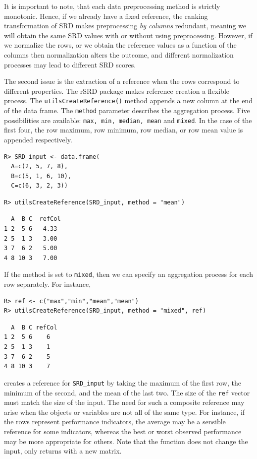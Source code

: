 It is important to note, that each data preprocessing method is strictly monotonic. Hence, if we already have a fixed reference, the ranking transformation of SRD makes preprocessing \emph{by columns} redundant, meaning we will obtain the same SRD values with or without using preprocessing. However, if we normalize the rows, or we obtain the reference values as a function of the columns then normalization alters the outcome, and different normalization processes may lead to different SRD scores.

The second issue is the extraction of a reference when the rows correspond to different properties. The rSRD package makes reference creation a flexible process. The \texttt{utilsCreateReference()} method appends a new column at the end of the data frame. The \texttt{method} parameter describes the aggregation process. Five possibilities are available: \texttt{max, min, median, mean} and \texttt{mixed}. In the case of the first four, the row maximum, row minimum, row median, or row mean value is appended respectively.

\begin{verbatim}
R> SRD_input <- data.frame(
  A=c(2, 5, 7, 8),
  B=c(5, 1, 6, 10),
  C=c(6, 3, 2, 3))
\end{verbatim}

\begin{verbatim}
R> utilsCreateReference(SRD_input, method = "mean")
\end{verbatim}
\begin{verbatim}
  A  B C  refCol
1 2  5 6   4.33
2 5  1 3   3.00
3 7  6 2   5.00
4 8 10 3   7.00
\end{verbatim}

If the method is set to \texttt{mixed}, then we can specify an aggregation process for each row separately. For instance,

\begin{verbatim}
R> ref <- c("max","min","mean","mean")
R> utilsCreateReference(SRD_input, method = "mixed", ref)
\end{verbatim}

\begin{verbatim}
  A  B C refCol
1 2  5 6    6
2 5  1 3    1
3 7  6 2    5
4 8 10 3    7
\end{verbatim}

\noindent creates a reference for \texttt{SRD\_input} by taking the maximum of the first row, the minimum of the second, and the mean of the last two. The size of the \texttt{ref} vector must match the size of the input. The need for such a composite reference may arise when the objects or variables are not all of the same type. For instance, if the rows represent performance indicators, the average may be a sensible reference for some indicators, whereas the best or worst observed performance may be more appropriate for others. Note that the function does not change the input, only returns with a new matrix.

